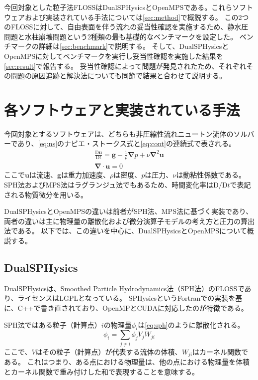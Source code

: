 	今回対象とした粒子法FLOSSはDualSPHysicsとOpenMPSである。これらソフトウェアおよび実装されている手法については\cref{sec:method}で概説する。
	この2つのFLOSSに対して、自由表面を伴う流れの妥当性確認を実施するため、静水圧問題と水柱崩壊問題という2種類の最も基礎的なベンチマークを設定した。
	ベンチマークの詳細は\cref{sec:benchmark}で説明する。
	そして、DualSPHysicsとOpenMPSに対してベンチマークを実行し妥当性確認を実施した結果を\cref{sec:result}で報告する。
	妥当性確認によって問題が発見されたため、それぞれその問題の原因追跡と解決法についても同節で結果と合わせて説明する。

\section{各ソフトウェアと実装されている手法 \label{sec:method}}
	今回対象とするソフトウェアは、どちらも非圧縮性流れニュートン流体のソルバーであり、\cref{eq:ns}のナビエ・ストークス式と\cref{eq:cont}の連続式で表される。
	\begin{gather}
		\frac{\mathrm{D} \mathbf{u}}{\mathrm{D} t} = \mathbf{g} - \frac{1}{\rho} \mathbf{\nabla} p + \nu \mathbf{\nabla}^2 \mathbf{u} \label{eq:ns} \\
		\mathbf{\nabla} \cdot \mathbf{u} = 0 \label{eq:cont}
	\end{gather}
	ここで$\mathbf{u}$は流速、$\mathbf{g}$は重力加速度、$\rho$は密度、$p$は圧力、$\nu$は動粘性係数である。
	SPH法およびMPS法はラグランジュ法でもあるため、時間変化率は$\mathrm{D}/\mathrm{D}t$で表記される物質微分を用いる。

	DualSPHysicsとOpenMPSの違いは前者がSPH法、MPS法に基づく実装であり、両者の違いは主に物理量の離散化および微分演算子モデルの考え方と圧力の算出法である。
	以下では、この違いを中心に、DualSPHysicsとOpenMPSについて概説する。

	\subsection{DualSPHysics}
		DualSPHysics\Cite{ref:dualsphysics}は、Smoothed Particle Hydrodynamics法（SPH法）\Cite{ref:sph1}\Cite{ref:sph2}のFLOSSであり、ライセンスはLGPLとなっている。
		SPHysicsというFortranでの実装を基に、C++で書き直されており、OpenMPとCUDAに対応したのが特徴である。

		SPH法ではある粒子（計算点）$i$の物理量$\phi_i$は\cref{eq:sph}のように離散化される。
		\begin{equation}
			\phi_i = \sum_{j \neq i} \phi_j V_j W_{ji} \label{eq:sph}
		\end{equation}
		ここで、$V$はその粒子（計算点）が代表する流体の体積、$W_{ji}$はカーネル関数である。
		これはつまり、ある点における物理量は、他の点における物理量を体積とカーネル関数で重み付けした和で表現することを意味する。

